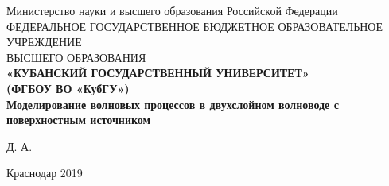 \documentclass[a4paper, 12pt]{article}
\begin{document}
\begin{center}
    \hfill \break
    \large{Министерство науки и высшего образования Российской Федерации}\\
    \footnotesize{ФЕДЕРАЛЬНОЕ ГОСУДАРСТВЕННОЕ БЮДЖЕТНОЕ ОБРАЗОВАТЕЛЬНОЕ УЧРЕЖДЕНИЕ}\\ 
    \footnotesize{ВЫСШЕГО ОБРАЗОВАНИЯ}\\
    \small{\textbf{«КУБАНСКИЙ ГОСУДАРСТВЕННЫЙ УНИВЕРСИТЕТ»}}\\
    \small{\textbf{(ФГБОУ ВО «КубГУ»)}}\\
    \hfill \break
     \hfill \break
    \hfill\break
    \hfill \break
    \hfill \break
    \hfill \break
     \hfill \break
    \hfill\break
    \hfill \break
    \hfill \break
    \hfill \break
    \Large{\bf Моделирование волновых процессов в двухслойном волноводе с поверхностным источником}\\
    \hfill \break
    \hfill \break
    \hfill \break
    \hfill \break
    \hfill \break
    \hfill \break
    \begin{flushright}
    \large{ Д. А.}
    \end{flushright}
    \hfill \break
    \hfill \break
    \end{center}
    \hfill \break
    \hfill \break
    \begin{center} Краснодар 2019 \end{center}
    \thispagestyle{empty} %
    
\newpage

\tableofcontents

\newpage
\end{document}

